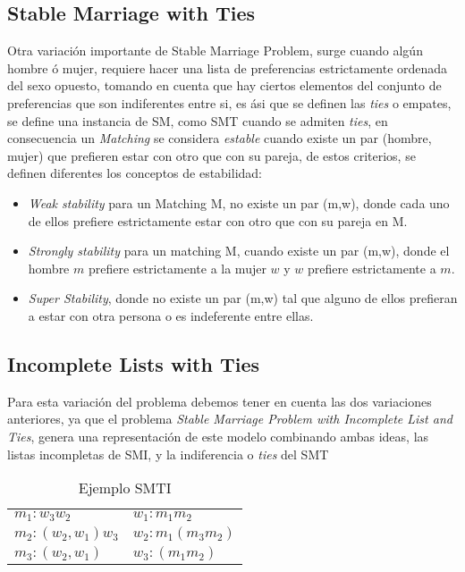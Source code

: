 \documentclass[letter, 10pt]{article}
\begin{document}
\subsection{Stable Marriage with Ties}

Otra variaci\'on importante de Stable Marriage Problem, surge cuando alg\'un hombre \'o mujer, requiere hacer una lista de 
preferencias estrictamente ordenada del sexo opuesto, tomando en cuenta que hay ciertos elementos del conjunto de preferencias
que son indiferentes entre si, es \'asi que se definen las \textit{ties} o empates, se define una instancia de SM, como SMT
cuando se admiten \textit{ties}, en consecuencia un \textit{Matching} se considera \textit{estable} cuando existe un par (hombre, 
mujer) que prefieren estar con otro que con su pareja, de estos criterios, se definen diferentes los conceptos de estabilidad:

\begin{itemize}
\item \textit{Weak stability} para un Matching M, no existe un par (m,w), donde cada uno de ellos prefiere estrictamente estar
con otro que con su pareja en M.
\item \textit{Strongly stability} para un matching M, cuando existe un par (m,w), donde el hombre $m$ prefiere 
estrictamente a la mujer $w$ y $w$ prefiere estrictamente a $m$.
\item \textit{Super Stability}, donde no existe un par (m,w) tal que alguno de ellos prefieran a estar con otra persona o es
 indeferente entre ellas.\cite{ManloveIrving02Hard,ThesisIoannis10}
\end{itemize} 
 

\subsection{Incomplete Lists with Ties}
	Para esta variaci\'on del problema debemos tener en cuenta las dos variaciones anteriores, ya que el problema \textit{Stable
Marriage Problem with Incomplete List and Ties}, genera una representaci\'on de este modelo combinando ambas ideas, las listas 
incompletas de SMI, y la indiferencia o \textit{ties} del SMT

\begin{table}[!h]
\centering
\begin{tabular}{l l}
$m_1: w_3 w_2$ & $w_1: m_1 m_2 $ \\
$m_2: (w_2,w_1) w_3$ & $w_2: m_1 (m_3 m_2) $ \\
$m_3: (w_2,w_1)$ & $w_3: ( m_1 m_2) $ \\
\end{tabular}
\caption{Ejemplo SMTI}
\end{table}
\end{document}
